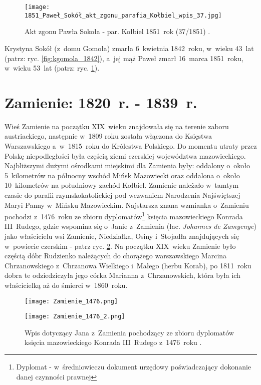   \begin{figure}[!ht]
    \vspace*{0.5cm}
    \centering \texttt{[image: 
        1851\_Paweł\_Sokół\_akt\_zgonu\_parafia\_Kołbiel\_wpis\_37.jpg]}
    \captionsetup{format=hang}
    \caption{Akt zgonu Pawła Sokoła - par. Kołbiel 1851~rok (37/1851) 
    \cite{par_kolbiel1}.}
    \label{fig:psokol_1851}
\end{figure}

Krystyna Sokół (z~domu Gomoła) zmarła 6~kwietnia 1842~roku, w~wieku 43~lat 
(patrz: ryc. \ref{fig:kgomola_1842}), a~jej mąż Paweł zmarł 16~marca 
1851~roku, w~wieku 53~lat (patrz: ryc. \ref{fig:psokol_1851}).

\newpage
\ifodd\value{page}\hbox{}\newpage\fi



\section{Zamienie: 1820~r. - 1839~r.}

Wieś Zamienie na początku XIX~wieku znajdowała się na terenie zaboru 
austriackiego, następnie w~1809 roku została włączona do Księstwa 
Warszawskiego a~w~1815~roku do Królestwa Polskiego. Do momentu utraty przez 
Polskę niepodległości była częścią ziemi czerskiej województwa mazowieckiego. 
Najbliższymi dużymi ośrodkami miejskimi dla Zamienia były: oddalony o~około 
5~kilometrów na północny wschód Mińsk Mazowiecki oraz oddalona o~około 
10~kilometrów na południowy zachód Kołbiel. Zamienie należało w~tamtym czasie 
do parafii rzymskokatolickiej pod wezwaniem Narodzenia Najświętszej Maryi 
Panny w~Mińsku Mazowieckim. Najstarsza znana wzmianka o~Zamieniu pochodzi 
z~1476~roku ze zbioru dyplomatów\footnote{Dyplomat - w~średniowieczu dokument 
urzędowy poświadczający dokonanie danej czynności prawnej} księcia 
mazowieckiego Konrada III~Rudego, gdzie wspomina się o~Janie z~Zamienia (łac. 
\emph{Johannes de Zamyenye}) jako właścicielu wsi Zamienie, Niedziałka, Osiny 
i~Stojadła znajdujących się w~powiecie czerskim - patrz ryc. 
\ref{fig:zamienie_1476}. Na początku XIX~wieku Zamienie było częścią dóbr 
Rudzienko należących do chorążego warszawskiego Marcina Chrzanowskiego 
z~Chrzanowa Wielkiego i~Małego (herbu Korab), po 1811~roku dobra te 
odziedziczyła jego córka Marianna z~Chrzanowskich, która była ich 
właścicielką aż do śmierci w~1860~roku.

\begin{figure}[!ht]
    \vspace*{0.5cm}
    \centering \texttt{[image: Zamienie\_1476.png]}

    \vspace*{0.5cm}

    \centering \texttt{[image: Zamienie\_1476\_2.png]}
    \captionsetup{format=hang}
    \caption{Wpis dotyczący Jana z~Zamienia pochodzący ze zbioru dyplomatów 
    księcia mazowieckiego Konrada III~Rudego z~1476~roku \cite{jlubomirski2}.}
    \label{fig:zamienie_1476}
\end{figure}

